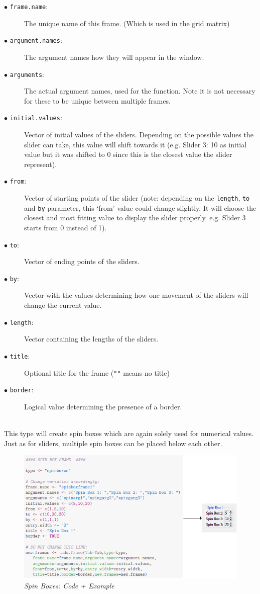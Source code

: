 \documentclass[a4paper]{article}\usepackage[]{graphicx}\usepackage[]{color}
\begin{document}
\begin{description}
  \item[$\bullet$ \texttt{frame.name}:] The unique name of this frame. (Which is used in the grid matrix)
  \item[$\bullet$ \texttt{argument.names}:] The argument names how they will
  appear in the window.  
  \item[$\bullet$ \texttt{arguments}:] The actual argument names, used for the
  function. Note it is not necessary for these to be unique between multiple
  frames.
  \item[$\bullet$ \texttt{initial.values}:] Vector of initial values of the
  sliders. Depending on the possible values the slider can take, this value will
  shift towards it (e.g. Slider 3: 10 as initial value but it was shifted to 0
  since this is the closest value the slider represent).
  \item[$\bullet$ \texttt{from}:] Vector of starting points of the slider
  (note: depending on the \verb|length|, \verb|to| and \verb|by| parameter, this
  `from' value could change slightly. It will choose the closest and most
  fitting value to display the slider properly. e.g. Slider 3 starts from 0
  instead of 1).
  \item[$\bullet$ \texttt{to}:] Vector of ending points of the sliders.
  \item[$\bullet$ \texttt{by}:] Vector with the values determining how one
  movement of the sliders will change the current value.
  \item[$\bullet$ \texttt{length}:] Vector containing the lengths of the
  sliders.
  \item[$\bullet$ \texttt{title}:] Optional title for the frame (\verb|""| means no title)
  \item[$\bullet$ \texttt{border}:] Logical value determining the presence of a
  border.   
  
\end{description}


\\
This type will create spin boxes which are again solely used for numerical
values. Just as for sliders, multiple spin boxes can be placed below each other.

\begin{figure}[H]
\centering
\includegraphics[scale=0.5]{figures/spinboxes.png}
\caption{{\it Spin Boxes: Code + Example}
\label{spinboxes}}
\end{figure}
\end{document}
